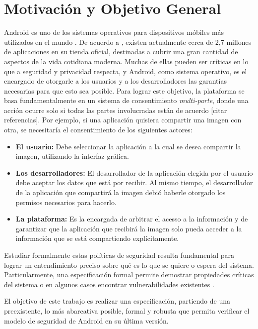 \section{Motivación y Objetivo General}

Android es uno de los sistemas operativos para dispositivos móbiles más
utilizados en el mundo \cite{1,2}. De acuerdo a \cite{3}, existen actualmente
cerca de 2,7 millones de aplicaciones en su tienda oficial, destinadas a cubrir
una gran cantidad de aspectos de la vida cotidiana moderna. Muchas de ellas
pueden ser críticas en lo que a seguridad y privacidad respecta, y Android, como
sistema operativo, es el encargado de otorgarle a los usuarios y a los
desarrolladores las garantías necesarias para que esto sea posible. Para lograr
este objetivo, la plataforma se basa fundamentalmente en un sistema de
consentimiento \textit{multi-parte}, donde una acción ocurre solo si todas las
partes involucradas están de acuerdo [citar referencias]. Por ejemplo, si una
aplicación quisiera compartir una imagen con otra, se necesitaría el
consentimiento de los siguientes actores:

\begin{itemize}
   \item \textbf{El usuario: } Debe seleccionar la aplicación a la cual se desea
   compartir la imagen, utilizando la interfaz gráfica.
   \item \textbf{Los desarrolladores: } El desarrollador de la aplicación
   elegida por el usuario debe aceptar los datos que está por recibir. Al mismo
   tiempo, el desarrollador de la aplicación que compartirá la imagen debió
   haberle otorgado los permisos necesarios para hacerlo.
   \item \textbf{La plataforma: } Es la encargada de arbitrar el acesso a la
   información y de garantizar que la aplicación que recibirá la imagen solo pueda
   acceder a la información que se está compartiendo explícitamente.
\end{itemize}


Estudiar formalmente estas políticas de seguridad resulta fundamental para
lograr un entendimiento preciso sobre qué es lo que se quiere o espera del
sistema. Particularmente, una especificación formal permite demostrar
propiedades críticas del sistema o en algunos casos encontrar vulnerabilidades
existentes \cite{alloy}.

El objetivo de este trabajo es realizar una especificación, partiendo de una
preexistente, lo más abarcativa posible, formal y robusta que permita verificar
el modelo de seguridad de Android en su última versión.
